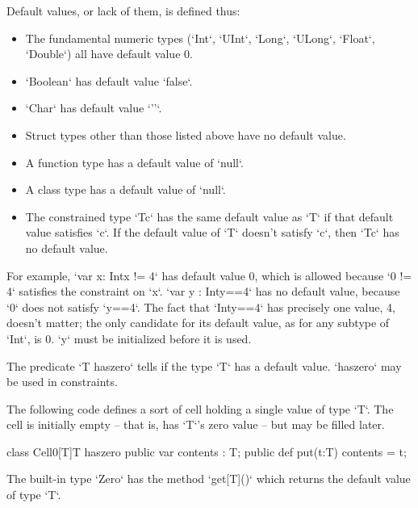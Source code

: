 Default values, or lack of them, is defined thus:
\begin{itemize}
\item The fundamental numeric types (\xcd`Int`, \xcd`UInt`,
      \xcd`Long`, \xcd`ULong`, 
      \xcd`Float`, \xcd`Double`) all have default value 0.
\item \xcd`Boolean` has default value \xcd`false`.
\item \xcd`Char` has default value \xcd`'\0'`.
\item Struct types other than those listed above have no default value.
\item A function type has a default value of \xcd`null`.
\item A class type has a default value of \xcd`null`.
\item The constrained type \xcd`T{c}` has the same default value as \xcd`T` if
      that default value satisfies \xcd`c`.  If the default value of \xcd`T`
      doesn't satisfy \xcd`c`, then \xcd`T{c}` has no default value.
\end{itemize}

For example, \xcd`var x: Int{x != 4}` has default value 0, which is allowed
because \xcd`0 != 4` satisfies the constraint on \xcd`x`. 
\xcd`var y : Int{y==4}` has no default value, because \xcd`0` does not satisfy \xcd`y==4`.
The fact that \xcd`Int{y==4}` has precisely one value, \viz{} 4, doesn't
matter; the only candidate for its default value, as for any subtype of
\xcd`Int`, is 0. \xcd`y` must be initialized before it is used.

The predicate \xcd`T haszero` tells if the type \xcd`T` has a default value.
\xcd`haszero` may be used in constraints. 

\begin{ex}
The following code defines a sort of cell holding a single value of type
\xcd`T`. The cell is initially empty -- that is, has \xcd`T`'s zero value --
but may be filled later. 
\begin{xten}
class Cell0[T]{T haszero} {
  public var contents : T;
  public def put(t:T) { contents = t; }
}
\end{xten}
%
\end{ex}

The built-in type \xcd`Zero` has the method \xcd`get[T]()` which
returns the default value of type \xcd`T`.  


